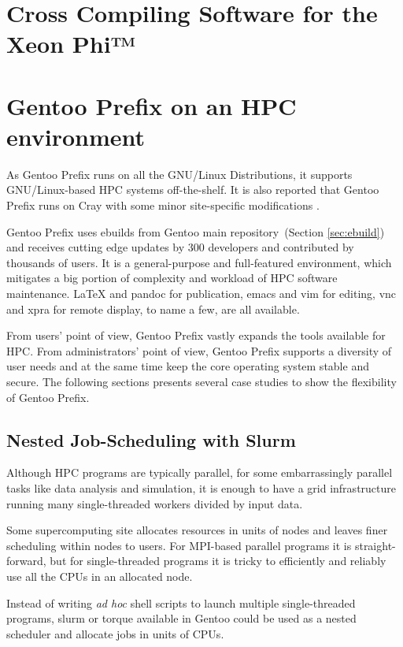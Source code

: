 \documentclass[a4paper,conference]{IEEEtran}
\begin{document}

\section{Cross Compiling Software for the Xeon Phi™}

\section{Gentoo Prefix on an HPC environment}
As Gentoo Prefix runs on all the GNU/Linux Distributions, it supports
GNU/Linux-based HPC systems off-the-shelf.  It is also reported that
Gentoo Prefix runs on Cray with some minor site-specific modifications
\cite{cray}.

Gentoo Prefix uses ebuilds from Gentoo main repository~(Section
\ref{sec:ebuild}) and receives cutting edge updates by 300 developers
and contributed by thousands of users.  It is a general-purpose and
full-featured environment, which mitigates a big portion of complexity
and workload of HPC software maintenance. \LaTeX{} and pandoc for
publication, emacs and vim for editing, vnc and xpra for remote
display, to name a few, are all available.

From users' point of view, Gentoo Prefix vastly expands the tools
available for HPC.  From administrators' point of view, Gentoo Prefix
supports a diversity of user needs and at the same time keep the core
operating system stable and secure. The following sections presents
several case studies to show the flexibility of Gentoo Prefix.

\subsection{Nested Job-Scheduling with Slurm}
\label{sec:slurm}
Although HPC programs are typically parallel, for some embarrassingly
parallel tasks like data analysis and simulation, it is enough to have
a grid infrastructure running many single-threaded workers divided by
input data.

Some supercomputing site allocates resources in units of nodes and
leaves finer scheduling within nodes to users.  For MPI-based parallel
programs it is straight-forward, but for single-threaded programs it
is tricky to efficiently and reliably use all the CPUs in an allocated
node.

Instead of writing \textit{ad hoc} shell scripts to launch multiple
single-threaded programs, slurm or torque available in Gentoo could be
used as a nested scheduler and allocate jobs in units of
CPUs.
\end{document}
